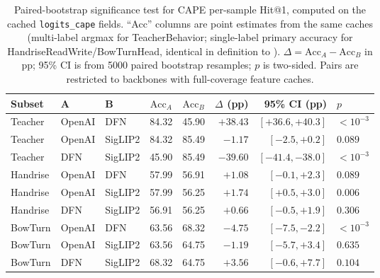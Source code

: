 \documentclass[electronics,article,submit,pdftex,moreauthors]{Definitions/mdpi}
\begin{document}
\begin{table}[H]
\caption{Paired-bootstrap significance test for CAPE per-sample Hit@1, computed on the cached \texttt{logits\_cape} fields. ``Acc'' columns are point estimates from the same caches (multi-label argmax for TeacherBehavior; single-label primary accuracy for HandriseReadWrite/BowTurnHead, identical in definition to ). $\Delta=\text{Acc}_A-\text{Acc}_B$ in pp; 95\% CI is from 5000 paired bootstrap resamples; $p$ is two-sided. Pairs are restricted to backbones with full-coverage feature caches.}
\label{tab:paired_bootstrap}
\centering
\small
\setlength{\tabcolsep}{4pt}
\begin{tabular}{l ll cc r r l}
\toprule
\textbf{Subset} & \textbf{A} & \textbf{B} & $\text{Acc}_A$ & $\text{Acc}_B$ & $\Delta$ (pp) & 95\% CI (pp) & $p$ \\
\midrule
Teacher  & OpenAI  & DFN     & 84.32 & 45.90 & $+38.43$ & $[+36.6,+40.3]$ & $<10^{-3}$ \\
Teacher  & OpenAI  & SigLIP2 & 84.32 & 85.49 & $-1.17$  & $[-2.5,+0.2]$    & $0.089$    \\
Teacher  & DFN     & SigLIP2 & 45.90 & 85.49 & $-39.60$ & $[-41.4,-38.0]$ & $<10^{-3}$ \\
\midrule
Handrise & OpenAI  & DFN     & 57.99 & 56.91 & $+1.08$  & $[-0.1,+2.3]$    & $0.089$    \\
Handrise & OpenAI  & SigLIP2 & 57.99 & 56.25 & $+1.74$  & $[+0.5,+3.0]$    & $0.006$    \\
Handrise & DFN     & SigLIP2 & 56.91 & 56.25 & $+0.66$  & $[-0.5,+1.9]$    & $0.306$    \\
\midrule
BowTurn  & OpenAI  & DFN     & 63.56 & 68.32 & $-4.75$  & $[-7.5,-2.2]$    & $<10^{-3}$ \\
BowTurn  & OpenAI  & SigLIP2 & 63.56 & 64.75 & $-1.19$  & $[-5.7,+3.4]$    & $0.635$    \\
BowTurn  & DFN     & SigLIP2 & 68.32 & 64.75 & $+3.56$  & $[-0.6,+7.7]$    & $0.104$    \\
\bottomrule
\end{tabular}
\end{table}
\end{document}
